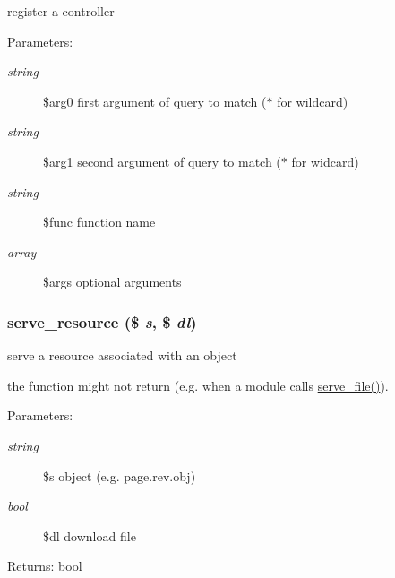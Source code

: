register a controller

\begin{Desc}
\item[Parameters:]
\begin{description}
\item[{\em string}]\$arg0 first argument of query to match ($\ast$ for wildcard) \item[{\em string}]\$arg1 second argument of query to match ($\ast$ for widcard) \item[{\em string}]\$func function name \item[{\em array}]\$args optional arguments \end{description}
\end{Desc}
\hypertarget{controller_8inc_8php_5d5274c3531eb05a1ea5927ff3cd08d3}{
\subsubsection[{serve\_\-resource}]{\setlength{\rightskip}{0pt plus 5cm}serve\_\-resource (\$ {\em s}, \/  \$ {\em dl})}}
\label{controller_8inc_8php_5d5274c3531eb05a1ea5927ff3cd08d3}


serve a resource associated with an object

the function might not return (e.g. when a module calls \hyperlink{util_8inc_8php_9d3ab20fc8b79fb6ab860f93600c745e}{serve\_\-file()}). \begin{Desc}
\item[Parameters:]
\begin{description}
\item[{\em string}]\$s object (e.g. page.rev.obj) \item[{\em bool}]\$dl download file \end{description}
\end{Desc}
\begin{Desc}
\item[Returns:]bool \end{Desc}

